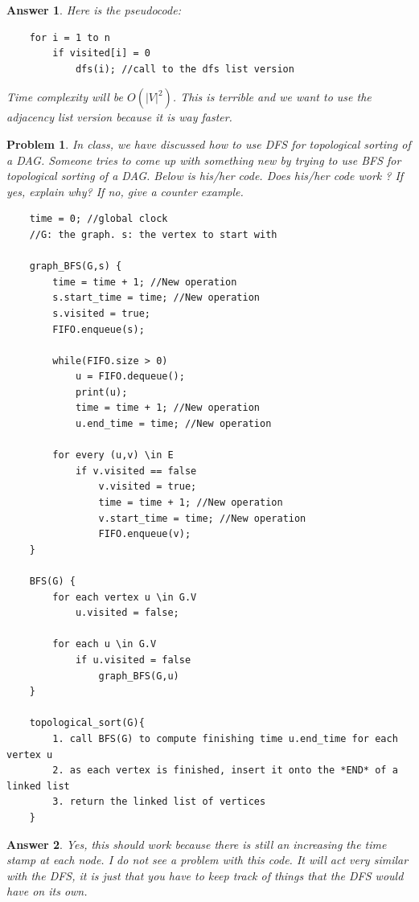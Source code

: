 \documentclass[11pt]{article}
\newtheorem{problem}{Problem}
\newtheorem{answer}{Answer}
\begin{document}
\begin{answer}
 \label{ans:3}
 Here is the pseudocode:
\begin{lstlisting}
	for i = 1 to n
		if visited[i] = 0
			dfs(i); //call to the dfs list version
\end{lstlisting}
Time complexity will be $O(|V|^2)$. This is terrible and we want to use the adjacency list version because it is way faster.
\end{answer}

\bigskip

\begin{problem}
 \label{prob:4}
 In class, we have discussed how to use DFS for topological sorting of a DAG. Someone tries to come up with something new by trying to use BFS for topological sorting of a DAG. Below is his/her code. Does his/her code work ? If yes, explain why? If no, give a counter example.
 
\begin{lstlisting}
	time = 0; //global clock
	//G: the graph. s: the vertex to start with
	
	graph_BFS(G,s) {
		time = time + 1; //New operation
		s.start_time = time; //New operation
		s.visited = true;
		FIFO.enqueue(s);
		
		while(FIFO.size > 0)
			u = FIFO.dequeue();
			print(u);
			time = time + 1; //New operation
			u.end_time = time; //New operation
			
		for every (u,v) \in E
			if v.visited == false
				v.visited = true;
				time = time + 1; //New operation
				v.start_time = time; //New operation
				FIFO.enqueue(v);
	}
	
	BFS(G) {
		for each vertex u \in G.V
			u.visited = false;
			
		for each u \in G.V
			if u.visited = false
				graph_BFS(G,u)
	}
	
	topological_sort(G){
		1. call BFS(G) to compute finishing time u.end_time for each vertex u
		2. as each vertex is finished, insert it onto the *END* of a linked list
		3. return the linked list of vertices
	}
\end{lstlisting}
\end{problem}

\begin{answer}
 \label{ans:4}
 Yes, this should work because there is still an increasing the time stamp at each node. I do not see a problem with this code. It will act very similar with the DFS, it is just that you have to keep track of things that the DFS would have on its own.
\end{answer}
\end{document}

